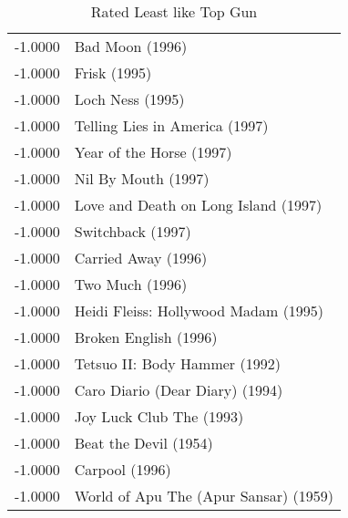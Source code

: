 \begin{flushleft}
\begin{table}[h]
\centering
\begin{tabular}{ll}
-1.0000 & Bad Moon (1996)                        \\
-1.0000 & Frisk (1995)                           \\
-1.0000 & Loch Ness (1995)                       \\
-1.0000 & Telling Lies in America (1997)         \\
-1.0000 & Year of the Horse (1997)               \\
-1.0000 & Nil By Mouth (1997)                    \\
-1.0000 & Love and Death on Long Island (1997)   \\
-1.0000 & Switchback (1997)                      \\
-1.0000 & Carried Away (1996)                    \\
-1.0000 & Two Much (1996)                        \\
-1.0000 & Heidi Fleiss: Hollywood Madam (1995)   \\
-1.0000 & Broken English (1996)                  \\
-1.0000 & Tetsuo II: Body Hammer (1992)          \\
-1.0000 & Caro Diario (Dear Diary) (1994)        \\
-1.0000 & Joy Luck Club The (1993)               \\
-1.0000 & Beat the Devil (1954)                  \\
-1.0000 & Carpool (1996)                         \\
-1.0000 & World of Apu The (Apur Sansar) (1959)       
\end{tabular}
\caption{Rated Least like Top Gun}
\end{table}

\end{flushleft}




